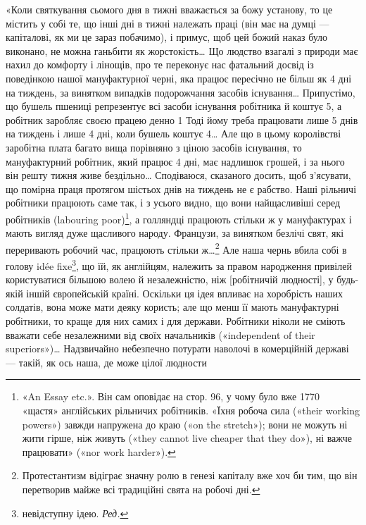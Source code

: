 
«Коли святкування сьомого дня в тижні вважається за божу
установу, то це містить у собі те, що інші дні в тижні належать
праці (він має на думці — капіталові, як ми це зараз побачимо),
і примус, щоб цей божий наказ було виконано, не можна ганьбити
як жорстокість\dots{} Що людство взагалі з природи має нахил до
комфорту і лінощів, про те переконує нас фатальний досвід із
поведінкою нашої мануфактурної черні, яка працює пересічно
не більш як 4 дні на тиждень, за винятком випадків подорожчання
засобів існування\dots{} Припустімо, що бушель пшениці репрезентує
всі засоби існування робітника й коштує 5, а робітник
заробляє своєю працею денно 1 Тоді йому треба працювати
лише 5 днів на тиждень і лише 4 дні, коли бушель коштує
4\dots{} Але що в цьому королівстві заробітна плата багато
вища порівняно з ціною засобів існування, то мануфактурний
робітник, який працює 4 дні, має надлишок грошей, і за нього
він решту тижня живе бездільно\dots{} Сподіваюся, сказаного досить,
щоб з’ясувати, що помірна праця протягом шістьох днів на тиждень
не є рабство. Наші рільничі робітники працюють саме так,
і з усього видно, що вони найщасливіші серед робітників (labouring
poor)\footnote{
«An Essay etc.». Він сам оповідає на стор. 96, у чому було вже
1770~ «щастя» англійських рільничих робітників. «Їхня робоча сила
(«their working powers») завжди напружена до краю («on the stretch»);
вони не можуть ні жити гірше, ніж живуть («they cannot live cheaper
that they do»), ні важче працювати» («nor work harder»).
}, а голляндці працюють стільки ж у мануфактурах і мають
вигляд дуже щасливого народу. Французи, за винятком безлічі
свят, які переривають робочий час, працюють стільки ж\dots{}\footnote{
Протестантизм відіграє значну ролю в генезі капіталу вже хоч
би тим, що він перетворив майже всі традиційні свята на робочі дні.
}
Але наша чернь вбила собі в голову idée fixe\footnote*{
невідступну ідею. \emph{Ред.}
}, що їй, як англійцям,
належить за правом народження привілей користуватися більшою
волею й незалежністю, ніж [робітничій людності], у будь-якій
іншій європейській країні. Оскільки ця ідея впливає на
хоробрість наших солдатів, вона може мати деяку користь; але
що менш її мають мануфактурні робітники, то краще для них
самих і для держави. Робітники ніколи не сміють вважати себе
незалежними від своїх начальників («independent of their superiors»)\dots{}
Надзвичайно небезпечно потурати наволочі в комерційній
державі — такій, як ось наша, де може  цілої людности

